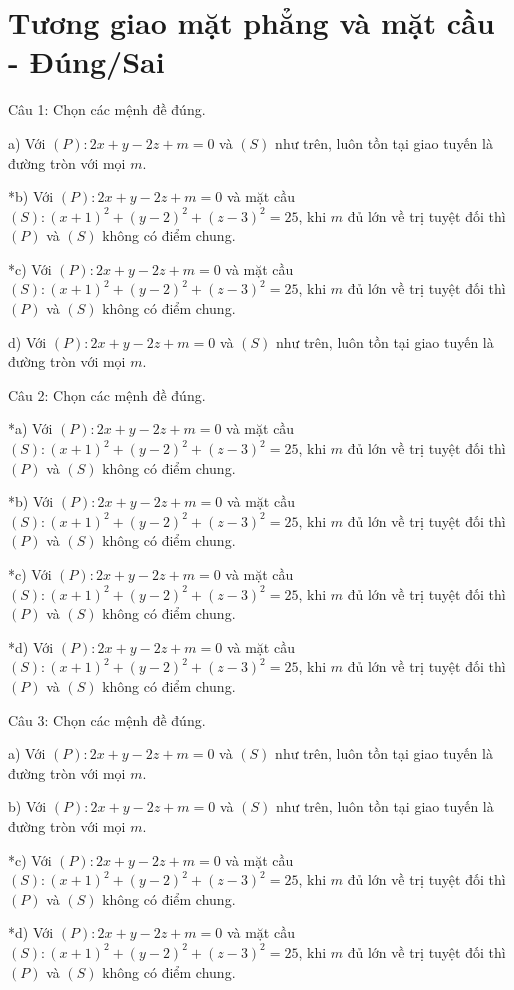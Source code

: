 \documentclass[a4paper,12pt]{article}
\begin{document}
\section*{Tương giao mặt phẳng và mặt cầu - Đúng/Sai}

Câu 1: Chọn các mệnh đề đúng.

a) Với $(P): 2x+y-2z+m=0$ và $(S)$ như trên, luôn tồn tại giao tuyến là đường tròn với mọi $m$.

*b) Với $(P): 2x+y-2z+m=0$ và mặt cầu $(S): (x+1)^2+(y-2)^2+(z-3)^2=25$, khi $m$ đủ lớn về trị tuyệt đối thì $(P)$ và $(S)$ không có điểm chung.

*c) Với $(P): 2x+y-2z+m=0$ và mặt cầu $(S): (x+1)^2+(y-2)^2+(z-3)^2=25$, khi $m$ đủ lớn về trị tuyệt đối thì $(P)$ và $(S)$ không có điểm chung.

d) Với $(P): 2x+y-2z+m=0$ và $(S)$ như trên, luôn tồn tại giao tuyến là đường tròn với mọi $m$.



Câu 2: Chọn các mệnh đề đúng.

*a) Với $(P): 2x+y-2z+m=0$ và mặt cầu $(S): (x+1)^2+(y-2)^2+(z-3)^2=25$, khi $m$ đủ lớn về trị tuyệt đối thì $(P)$ và $(S)$ không có điểm chung.

*b) Với $(P): 2x+y-2z+m=0$ và mặt cầu $(S): (x+1)^2+(y-2)^2+(z-3)^2=25$, khi $m$ đủ lớn về trị tuyệt đối thì $(P)$ và $(S)$ không có điểm chung.

*c) Với $(P): 2x+y-2z+m=0$ và mặt cầu $(S): (x+1)^2+(y-2)^2+(z-3)^2=25$, khi $m$ đủ lớn về trị tuyệt đối thì $(P)$ và $(S)$ không có điểm chung.

*d) Với $(P): 2x+y-2z+m=0$ và mặt cầu $(S): (x+1)^2+(y-2)^2+(z-3)^2=25$, khi $m$ đủ lớn về trị tuyệt đối thì $(P)$ và $(S)$ không có điểm chung.



Câu 3: Chọn các mệnh đề đúng.

a) Với $(P): 2x+y-2z+m=0$ và $(S)$ như trên, luôn tồn tại giao tuyến là đường tròn với mọi $m$.

b) Với $(P): 2x+y-2z+m=0$ và $(S)$ như trên, luôn tồn tại giao tuyến là đường tròn với mọi $m$.

*c) Với $(P): 2x+y-2z+m=0$ và mặt cầu $(S): (x+1)^2+(y-2)^2+(z-3)^2=25$, khi $m$ đủ lớn về trị tuyệt đối thì $(P)$ và $(S)$ không có điểm chung.

*d) Với $(P): 2x+y-2z+m=0$ và mặt cầu $(S): (x+1)^2+(y-2)^2+(z-3)^2=25$, khi $m$ đủ lớn về trị tuyệt đối thì $(P)$ và $(S)$ không có điểm chung.
\end{document}
